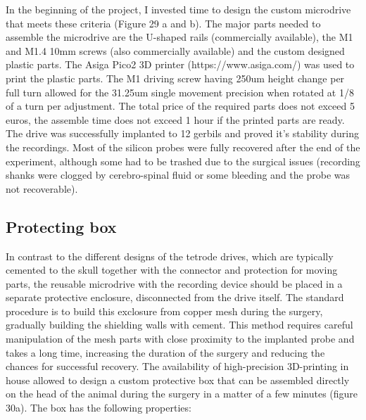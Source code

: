 In the beginning of the project, I invested time to design the custom microdrive that meets these criteria (Figure 29 a and b). The major parts needed to assemble the microdrive are the U-shaped rails (commercially available), the M1 and M1.4 10mm screws (also commercially available) and the custom designed plastic parts. The Asiga Pico2 3D printer (https://www.asiga.com/) was used to print the plastic parts. The M1 driving screw having 250um height change per full turn allowed for the 31.25um single movement precision when rotated at 1/8 of a turn per adjustment. The total price of the required parts does not exceed 5 euros, the assemble time does not exceed 1 hour if the printed parts are ready. The drive was successfully implanted to 12 gerbils and proved it’s stability during the recordings. Most of the silicon probes were fully recovered after the end of the experiment, although some had to be trashed due to the surgical issues (recording shanks were clogged by cerebro-spinal fluid or some bleeding and the probe was not recoverable).

\subsection{Protecting box}

In contrast to the different designs of the tetrode drives, which are typically cemented to the skull together with the connector and protection for moving parts, the reusable microdrive with the recording device should be placed in a separate protective enclosure, disconnected from the drive itself. The standard procedure is to build this exclosure from copper mesh during the surgery, gradually building the shielding walls with cement. This method requires careful manipulation of the mesh parts with close proximity to the implanted probe and takes a long time, increasing the duration of the surgery and reducing the chances for successful recovery. The availability of high-precision 3D-printing in house allowed to design a custom protective box that can be assembled directly on the head of the animal during the surgery in a matter of a few minutes (figure 30a). The box has the following properties:

